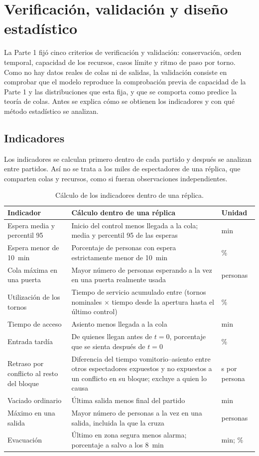 \section{Verificación, validación y diseño estadístico}\label{sec:verificacion}

La Parte 1 fijó cinco criterios de verificación y validación: conservación,
orden temporal, capacidad de los recursos, casos límite y ritmo de paso por
torno. Como no hay datos reales de colas ni de salidas, la validación consiste en
comprobar que el modelo reproduce la comprobación previa de capacidad de la
Parte 1 y las distribuciones que esta fija, y que se comporta como predice la
teoría de colas. Antes se explica cómo se obtienen los indicadores y con qué
método estadístico se analizan.

\subsection{Indicadores}\label{sec:indicadores}

Los indicadores se calculan primero dentro de cada partido y después se analizan
entre partidos. Así no se trata a los miles de espectadores de una réplica, que
comparten colas y recursos, como si fueran observaciones independientes.

\begin{table}[htbp]
\centering\small
\caption{Cálculo de los indicadores dentro de una réplica.}
\label{tab:indicadores}
\begin{tabularx}{\textwidth}{@{}p{3.6cm}Yp{2.1cm}@{}}
\toprule
Indicador & Cálculo dentro de una réplica & Unidad \\
\midrule
Espera media y percentil 95 & Inicio del control menos llegada a la cola; media y percentil 95 de las esperas & min \\
Espera menor de 10~min & Porcentaje de personas con espera estrictamente menor de 10~min & \% \\
Cola máxima en una puerta & Mayor número de personas esperando a la vez en una puerta realmente usada & personas \\
Utilización de los tornos & Tiempo de servicio acumulado entre (tornos nominales $\times$ tiempo desde la apertura hasta el último control) & \% \\
Tiempo de acceso & Asiento menos llegada a la cola & min \\
Entrada tardía & De quienes llegan antes de $t=0$, porcentaje que se sienta después de $t=0$ & \% \\
Retraso por conflicto al resto del bloque & Diferencia del tiempo vomitorio--asiento entre otros espectadores expuestos y no expuestos a un conflicto en su bloque; excluye a quien lo causa & s por persona \\
Vaciado ordinario & Última salida menos final del partido & min \\
Máximo en una salida & Mayor número de personas a la vez en una salida, incluida la que la cruza & personas \\
Evacuación & Último en zona segura menos alarma; porcentaje a salvo a los 8~min & min; \% \\
\bottomrule
\end{tabularx}
\end{table}

